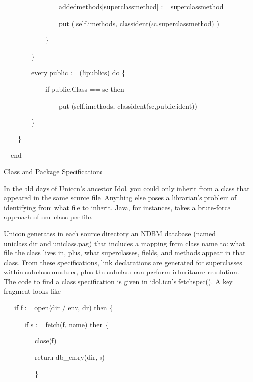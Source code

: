 {\ttfamily\mdseries
\ \ \ \ \ \ \ \ \ \ \ \ \ \ \ \ addedmethods[superclassmethod] := superclassmethod}

{\ttfamily\mdseries
\ \ \ \ \ \ \ \ \ \ \ \ \ \ \ \ put ( self.imethods, classident(sc,superclassmethod) )}

{\ttfamily\mdseries
\ \ \ \ \ \ \ \ \ \ \ \ \}}

{\ttfamily\mdseries
\ \ \ \ \ \ \ \ \}}

{\ttfamily\mdseries
\ \ \ \ \ \ \ \ every public := (!ipublics) do \{}

{\ttfamily\mdseries
\ \ \ \ \ \ \ \ \ \ \ \ if public.Class == sc then}

{\ttfamily\mdseries
\ \ \ \ \ \ \ \ \ \ \ \ \ \ \ \ put (self.imethods, classident(sc,public.ident))}

{\ttfamily\mdseries
\ \ \ \ \ \ \ \ \}}

{\ttfamily\mdseries
\ \ \ \ \}}

{\ttfamily\mdseries
\ \ end}

{\sffamily
Class and Package Specifications }


In the {\textquotedbl}old days{\textquotedbl} of Unicon's ancestor
Idol, you could only inherit from a class that appeared in the same
source file. Anything else poses a librarian's problem of identifying
from what file to inherit.  Java, for instances, takes a brute-force
approach of one class per file.

Unicon generates in each source directory an NDBM database (named
uniclass.dir and uniclass.pag) that includes a mapping from class name
to: what file the class lives in, plus, what superclasses, fields, and
methods appear in that class.  From these specifications,
{\textquotedbl}link{\textquotedbl} declarations are generated for
superclasses within subclass modules, plus the subclass can perform
inheritance resolution. The code to find a class specification is
given in idol.icn's fetchspec(). A key fragment looks like

{\ttfamily\mdseries
\ \ \ if f := open(dir {\textbar}{\textbar} {\textquotedbl}/{\textquotedbl} {\textbar}{\textbar} env,
{\textquotedbl}dr{\textquotedbl}) then \{}

{\ttfamily\mdseries
\ \ \ \ \ \ if s := fetch(f, name) then \{}

{\ttfamily\mdseries
\ \ \ \ \ \ \ \ \ close(f)}

{\ttfamily\mdseries
\ \ \ \ \ \ \ \ \ return db\_entry(dir, s)}

{\ttfamily\mdseries
\ \ \ \ \ \ \ \ \ \}}


